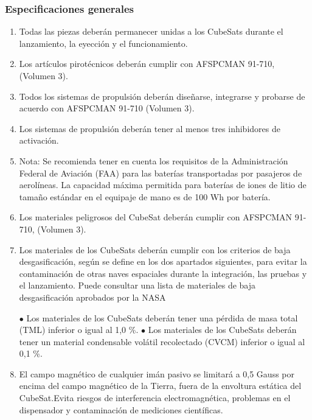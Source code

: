 \documentclass[12pt]{article}
\begin{document}
	\subsubsection{Especificaciones generales}
	
	\begin{enumerate}
		\item Todas las piezas deberán permanecer unidas a los CubeSats durante el lanzamiento, la eyección y el funcionamiento.
		
		\item Los artículos pirotécnicos deberán cumplir con AFSPCMAN 91-710, (Volumen 3). \cite{AFSPCMAN91710}
		
		\item Todos los sistemas de propulsión deberán diseñarse, integrarse y probarse de acuerdo con AFSPCMAN 91-710 (Volumen 3).
		
		\item Los sistemas de propulsión deberán tener al menos tres inhibidores de activación.
		
		\item Nota: Se recomienda tener en cuenta los requisitos de la Administración Federal de Aviación (FAA) \cite{FAA2025Lithium} para las baterías transportadas por pasajeros de aerolíneas. La capacidad máxima permitida para baterías de iones de litio de tamaño estándar en el equipaje de mano es de 100 Wh por batería. 
		
		\item Los materiales peligrosos del CubeSat deberán cumplir con AFSPCMAN 91-710, (Volumen 3).
		
		\item Los materiales de los CubeSats deberán cumplir con los criterios de baja desgasificación, según se define en los dos apartados siguientes, para evitar la contaminación de otras naves espaciales durante la integración, las pruebas y el lanzamiento. Puede consultar una lista de materiales de baja desgasificación aprobados por la NASA \cite{NASA2025OutgassingDB}
		
		\subitem $\bullet$ Los materiales de los CubeSats deberán tener una pérdida de masa total (TML) inferior o igual al 1,0 \%.
		\subitem $\bullet$ Los materiales de los CubeSats deberán tener un material condensable volátil recolectado (CVCM) inferior o igual al 0,1 \%.
		
		\item El campo magnético de cualquier imán pasivo se limitará a 0,5 Gauss por encima del campo magnético de la Tierra, fuera de la envoltura estática del CubeSat.Evita riesgos de interferencia electromagnética, problemas en el dispensador y contaminación de mediciones científicas.
		

\end{enumerate}
\end{document}
